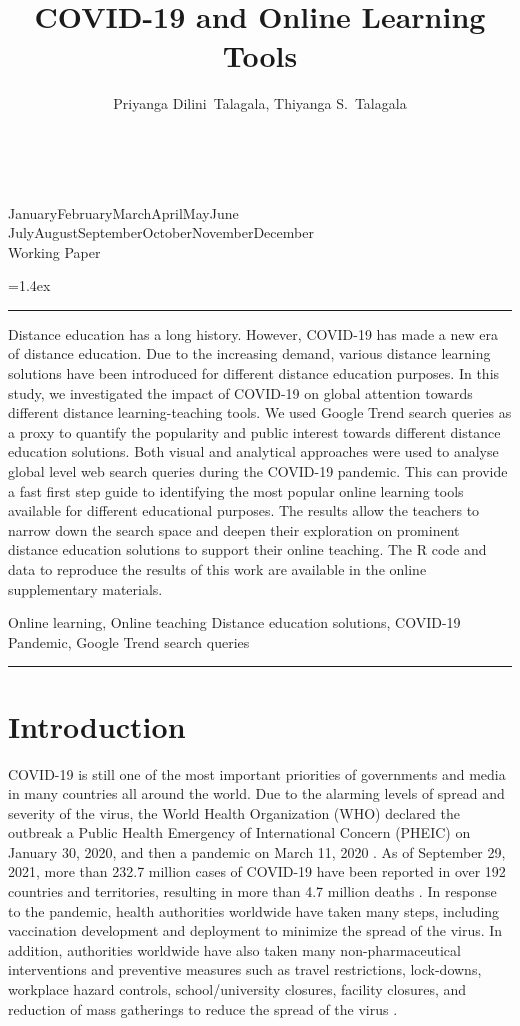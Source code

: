 \documentclass[11pt,a4paper,]{article}
\title{COVID-19 and Online Learning Tools}
\author{Priyanga Dilini~Talagala, Thiyanga S.~Talagala}
\date{\sf\Date~\Month~\Year}
\makeatletter
\def\Date{\number\day}
\def\Month{\ifcase\month\or
 January\or February\or March\or April\or May\or June\or
 July\or August\or September\or October\or November\or December\fi}
\def\Year{\number\year}
\def\showjel{{\large\textsf{\textbf{JEL classification:}}~\@jel}}
\def\cover{{\sffamily\setcounter{page}{0}
        \thispagestyle{empty}
        \vspace*{2cm}
        \begin{center}
        \fbox{\parbox{14cm}{\begin{onehalfspace}\centering\Huge\vspace*{0.3cm}
                \textsf{\textbf{\expandafter{\@title}}}\vspace{1cm}\par
                \LARGE\@author\end{onehalfspace}
        }}
        \end{center}
        \vfill
                \begin{center}\Large
                \Month~\Year\\[1cm]
                Working Paper \@wp
        \end{center}\vspace*{2cm}}}
\def\pageone{{\sffamily\setstretch{1}%
        \thispagestyle{empty}%
        \vbox to \textheight{%
        \raggedright\baselineskip=1.2cm
     {\fontsize{24.88}{30}\sffamily\textbf{\expandafter{\@title}}}
        \vspace{2cm}\par
        \hspace{1cm}\parbox{14cm}{\sffamily\large\@addresses}\vspace{1cm}\vfill
        \hspace{1cm}{\large\Date~\Month~\Year}\\[1cm]
        \hspace{1cm}\showjel\vss}}}
\def\blindtitle{{\sffamily
     \thispagestyle{plain}\raggedright\baselineskip=1.2cm
     {\fontsize{24.88}{30}\sffamily\textbf{\expandafter{\@title}}}\vspace{1cm}\par
        }}
\def\titlepage{{\cover\newpage\pageone\newpage\blindtitle}}
\let\maketitle\titlepage
\newenvironment{keywords}{\par\vspace{0.5cm}\noindent{\sffamily\textbf{Keywords:}}}{\vspace{0.25cm}\par\hrule\vspace{0.5cm}\par}
\renewenvironment{abstract}{\begin{minipage}{\textwidth}\parskip=1.4ex\noindent
\hrule\vspace{0.1cm}\par{\sffamily\textbf{\abstractname}}\newline}
  {\end{minipage}}
\makeatother
\begin{document}
\maketitle
\begin{abstract}
Distance education has a long history. However, COVID-19 has made a new era of distance education. Due to the increasing demand, various distance learning solutions have been introduced for different distance education purposes. In this study, we investigated the impact of COVID-19 on global attention towards different distance learning-teaching tools. We used Google Trend search queries as a proxy to quantify the popularity and public interest towards different distance education solutions. Both visual and analytical approaches were used to analyse global level web search queries during the COVID-19 pandemic. This can provide a fast first step guide to identifying the most popular online learning tools available for different educational purposes. The results allow the teachers to narrow down the search space and deepen their exploration on prominent distance education solutions to support their online teaching. The R code and data to reproduce the results of this work are available in the online supplementary materials.
\end{abstract}
\begin{keywords}
Online learning, Online teaching Distance education solutions, COVID-19 Pandemic, Google Trend search queries
\end{keywords}

\hypertarget{introduction}{%
\section{Introduction}\label{introduction}}

COVID-19 is still one of the most important priorities of governments and media in many countries all around the world. Due to the alarming levels of spread and severity of the virus, the World Health Organization (WHO) declared the outbreak a Public Health Emergency of International Concern (PHEIC) on January 30, 2020, and then a pandemic on March 11, 2020 \autocite{world2020timeline}. As of September 29, 2021, more than 232.7 million cases of COVID-19 have been reported in over 192 countries and territories, resulting in more than 4.7 million deaths \autocite{dong2020interactive}. In response to the pandemic, health authorities worldwide have taken many steps, including vaccination development and deployment to minimize the spread of the virus. In addition, authorities worldwide have also taken many non-pharmaceutical interventions and preventive measures such as travel restrictions, lock-downs, workplace hazard controls, school/university closures, facility closures, and reduction of mass gatherings to reduce the spread of the virus \autocite{chang2020modelling}.
\end{document}
